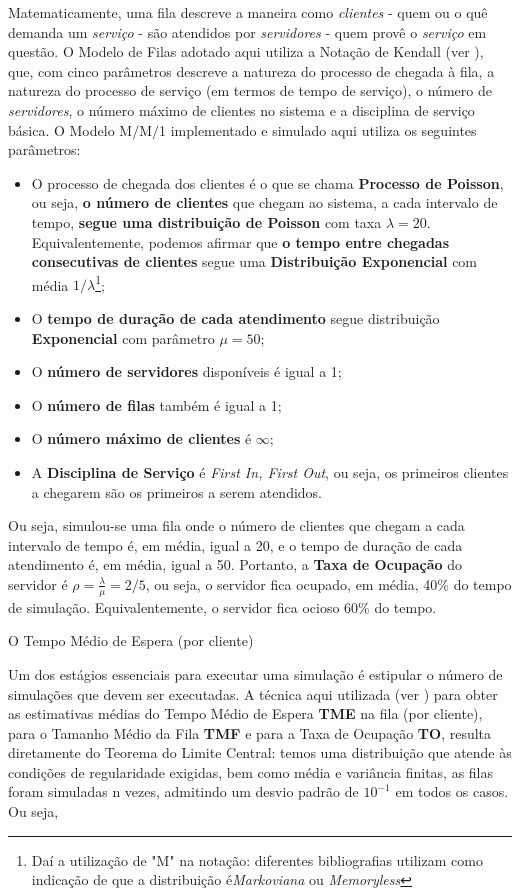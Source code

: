 \documentclass[a4paper,12pt,english,brazil]{article}
\begin{document}
Matematicamente, uma fila descreve a maneira como \textit{clientes} - quem ou o quê demanda um \textit{serviço} - são atendidos por \textit{servidores} - quem provê o \textit{serviço} em questão. O Modelo de Filas adotado aqui utiliza a Notação de Kendall (ver \citet{bose2013introduction}), que, com cinco parâmetros descreve a natureza do processo de chegada à fila, a natureza do processo de serviço (em termos de tempo de serviço), o número de \textit{servidores}, o número máximo de clientes no sistema e a disciplina de serviço básica. O Modelo M$/$M$/$1 implementado e simulado aqui utiliza os seguintes parâmetros:

\begin{itemize}
\item O processo de chegada dos clientes é o que se chama \textbf{Processo de Poisson}, ou seja,\textbf{ o número de clientes} que chegam ao sistema, a cada intervalo de tempo, \textbf{segue uma distribuição de Poisson} com taxa $\lambda = 20$. Equivalentemente, podemos afirmar que \textbf{o tempo entre chegadas consecutivas de clientes} segue uma \textbf{Distribuição Exponencial} com média $1/\lambda$\footnote{Daí a utilização de "M" na notação: diferentes bibliografias utilizam como indicação de que a distribuição é\textit{Markoviana} ou \textit{Memoryless}};
\item O \textbf{tempo de duração de cada atendimento} segue distribuição \textbf{Exponencial} com parâmetro $\mu = 50$;
\item O \textbf{número de servidores} disponíveis é igual a 1;
\item O \textbf{número de filas} também é igual a 1;
\item O \textbf{número máximo de clientes} é $\infty$;
\item A \textbf{Disciplina de Serviço} é \textit{First In, First Out}, ou seja, os primeiros clientes a chegarem são os primeiros a serem atendidos.
\end{itemize}

Ou seja, simulou-se uma fila onde o número de clientes que chegam a cada intervalo de tempo é, em média, igual a 20, e o tempo de duração de cada atendimento é, em média, igual a 50. Portanto, a \textbf{Taxa de Ocupação} do servidor é $\rho = \frac{\lambda}{\mu} = 2/5$, ou seja, o servidor fica ocupado, em média, 40\% do tempo de simulação. Equivalentemente, o servidor fica ocioso 60\% do tempo.

O Tempo Médio de Espera (por cliente) 

Um dos estágios essenciais para executar uma simulação é estipular o número de simulações que devem ser executadas. A técnica aqui utilizada (ver \cite{ross2013simulation}) para obter as estimativas médias do Tempo Médio de Espera \textbf{TME} na fila (por cliente), para o Tamanho Médio da Fila \textbf{TMF} e para a Taxa de Ocupação \textbf{TO}, resulta diretamente do Teorema do Limite Central: temos uma distribuição que atende às condições de regularidade exigidas, bem como média e variância finitas, as filas foram simuladas n vezes, admitindo um desvio padrão de $10^{-1}$ em todos os casos. Ou seja,
\end{document}
